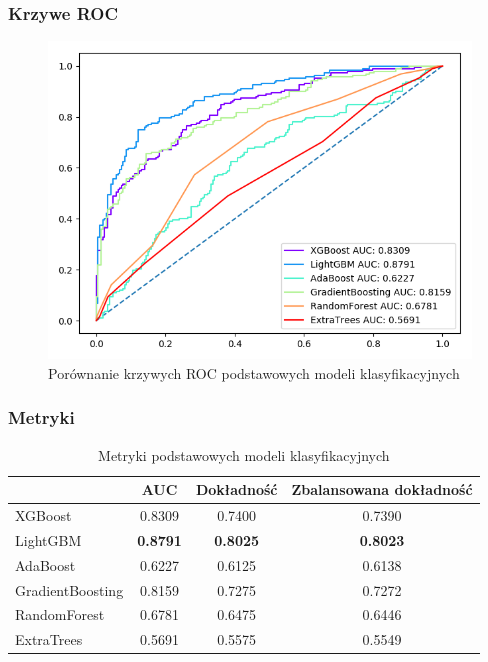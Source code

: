 \documentclass{beamer}
\begin{document}
    \begin{frame}
        \frametitle{Krzywe ROC}
        \begin{figure}[!h]
            \centering
            \includegraphics[width=0.8\linewidth]{../images/roc-comparison.png}
            \caption{Porównanie krzywych ROC podstawowych modeli klasyfikacyjnych}
            \label{fig:roc-comparison}
        \end{figure}
    \end{frame}

    \begin{frame}
        \frametitle{Metryki}
        \begin{table}
            \begin{tabular}{l|*{3}{c}}
                & AUC & Dokładność & Zbalansowana dokładność \\
                \hline
                XGBoost & 0.8309 & 0.7400 & 0.7390 \\
                LightGBM & \textbf{0.8791} & \textbf{0.8025} & \textbf{0.8023} \\
                AdaBoost & 0.6227 & 0.6125 & 0.6138 \\
                GradientBoosting & 0.8159 & 0.7275 & 0.7272 \\
                RandomForest & 0.6781 & 0.6475 & 0.6446 \\
                ExtraTrees & 0.5691 & 0.5575 & 0.5549 \\
            \end{tabular}
            \caption{Metryki podstawowych modeli klasyfikacyjnych}
            \label{tab:score-comparison-1}
        \end{table}
    \end{frame}
\end{document}

